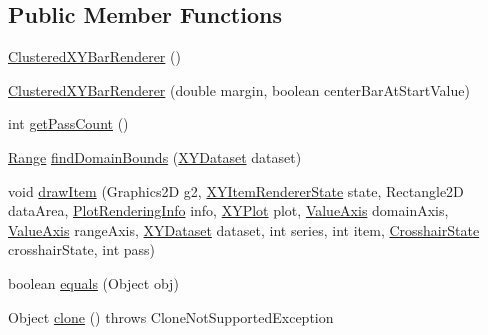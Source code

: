 \subsection*{Public Member Functions}
\begin{DoxyCompactItemize}
\item 
\mbox{\hyperlink{classorg_1_1jfree_1_1chart_1_1renderer_1_1xy_1_1_clustered_x_y_bar_renderer_a7239158b1ed7cd9db1981a2d1dd95934}{Clustered\+X\+Y\+Bar\+Renderer}} ()
\item 
\mbox{\hyperlink{classorg_1_1jfree_1_1chart_1_1renderer_1_1xy_1_1_clustered_x_y_bar_renderer_a5e2ea7f92bbd0e649078c895c174f8cb}{Clustered\+X\+Y\+Bar\+Renderer}} (double margin, boolean center\+Bar\+At\+Start\+Value)
\item 
int \mbox{\hyperlink{classorg_1_1jfree_1_1chart_1_1renderer_1_1xy_1_1_clustered_x_y_bar_renderer_adbbc17255a3b8466ac32893a9c46568e}{get\+Pass\+Count}} ()
\item 
\mbox{\hyperlink{classorg_1_1jfree_1_1data_1_1_range}{Range}} \mbox{\hyperlink{classorg_1_1jfree_1_1chart_1_1renderer_1_1xy_1_1_clustered_x_y_bar_renderer_a47251aac68f79159a1c5206e79d17341}{find\+Domain\+Bounds}} (\mbox{\hyperlink{interfaceorg_1_1jfree_1_1data_1_1xy_1_1_x_y_dataset}{X\+Y\+Dataset}} dataset)
\item 
void \mbox{\hyperlink{classorg_1_1jfree_1_1chart_1_1renderer_1_1xy_1_1_clustered_x_y_bar_renderer_a626dbddb6ad46aa90f88fdd3e46f1242}{draw\+Item}} (Graphics2D g2, \mbox{\hyperlink{classorg_1_1jfree_1_1chart_1_1renderer_1_1xy_1_1_x_y_item_renderer_state}{X\+Y\+Item\+Renderer\+State}} state, Rectangle2D data\+Area, \mbox{\hyperlink{classorg_1_1jfree_1_1chart_1_1plot_1_1_plot_rendering_info}{Plot\+Rendering\+Info}} info, \mbox{\hyperlink{classorg_1_1jfree_1_1chart_1_1plot_1_1_x_y_plot}{X\+Y\+Plot}} plot, \mbox{\hyperlink{classorg_1_1jfree_1_1chart_1_1axis_1_1_value_axis}{Value\+Axis}} domain\+Axis, \mbox{\hyperlink{classorg_1_1jfree_1_1chart_1_1axis_1_1_value_axis}{Value\+Axis}} range\+Axis, \mbox{\hyperlink{interfaceorg_1_1jfree_1_1data_1_1xy_1_1_x_y_dataset}{X\+Y\+Dataset}} dataset, int series, int item, \mbox{\hyperlink{classorg_1_1jfree_1_1chart_1_1plot_1_1_crosshair_state}{Crosshair\+State}} crosshair\+State, int pass)
\item 
boolean \mbox{\hyperlink{classorg_1_1jfree_1_1chart_1_1renderer_1_1xy_1_1_clustered_x_y_bar_renderer_ae05660f34438f87136183926b90e2754}{equals}} (Object obj)
\item 
Object \mbox{\hyperlink{classorg_1_1jfree_1_1chart_1_1renderer_1_1xy_1_1_clustered_x_y_bar_renderer_a1e43afa8b1861eaacf689f76ea7c45c5}{clone}} ()  throws Clone\+Not\+Supported\+Exception 
\end{DoxyCompactItemize}
